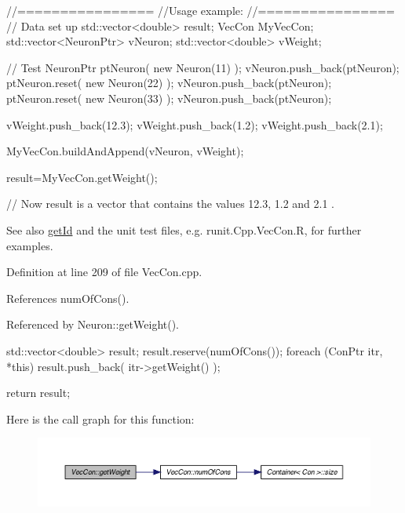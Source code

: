 \begin{DoxyCode}
        //================
        //Usage example:
        //================
        // Data set up
                std::vector<double> result;
                VecCon MyVecCon;
                std::vector<NeuronPtr> vNeuron;
                std::vector<double> vWeight;


        // Test
                NeuronPtr ptNeuron( new Neuron(11) );
                vNeuron.push_back(ptNeuron);
                ptNeuron.reset( new Neuron(22) );
                vNeuron.push_back(ptNeuron);
                ptNeuron.reset( new Neuron(33) );
                vNeuron.push_back(ptNeuron);

                vWeight.push_back(12.3);
                vWeight.push_back(1.2);
                vWeight.push_back(2.1);

                MyVecCon.buildAndAppend(vNeuron, vWeight);

                result=MyVecCon.getWeight();

        // Now result is a vector that contains the values 12.3, 1.2 and 2.1 .
\end{DoxyCode}


\begin{DoxySeeAlso}{See also}
\hyperlink{class_vec_con_a03d5dde143e166e68b01c9596573eb5f}{getId} and the unit test files, e.g. runit.Cpp.VecCon.R, for further examples. 
\end{DoxySeeAlso}


Definition at line 209 of file VecCon.cpp.



References numOfCons().



Referenced by Neuron::getWeight().


\begin{DoxyCode}
{
  std::vector<double> result;
  result.reserve(numOfCons());
  foreach (ConPtr itr, *this)
    {
      result.push_back( itr->getWeight() );
    }

  return result;
}
\end{DoxyCode}


Here is the call graph for this function:\nopagebreak
\begin{figure}[H]
\begin{center}
\leavevmode
\includegraphics[width=400pt]{class_vec_con_aafa37c30d566b8784ac84d23a14b5638_cgraph}
\end{center}
\end{figure}




